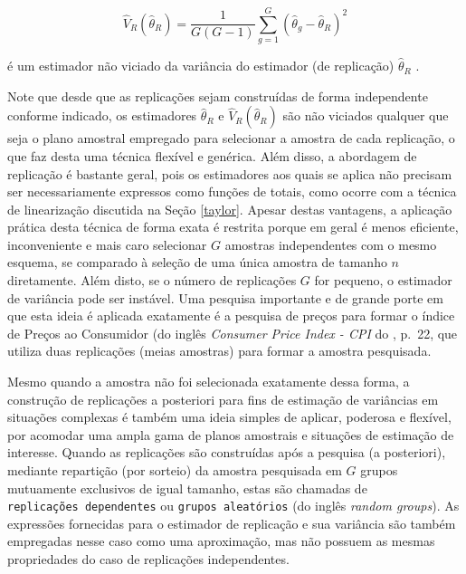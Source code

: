 \documentclass[]{book}
\numberwithin{example}{chapter}
\numberwithin{remark}{chapter}
\numberwithin{definition}{chapter}
\begin{document}
\begin{equation}
\widehat{V}_{R}\left( \widehat{\theta }_{R}\right) =\frac{1}{G\left(
G-1\right) }\sum_{g=1}^{G}\left( \widehat{\theta }_{g}-\widehat{\theta }%
_{R}\right) ^{2}  \label{eq:estpa24}
\end{equation}

é um estimador não viciado da variância do estimador (de replicação)
\(\widehat{\theta }_{R}\) .

Note que desde que as replicações sejam construídas de forma
independente conforme indicado, os estimadores \(\widehat{\theta }_{R}\)
e \(\widehat{V}_{R}\left( \widehat{\theta }_{R}\right)\) são não
viciados qualquer que seja o plano amostral empregado para selecionar a
amostra de cada replicação, o que faz desta uma técnica flexível e
genérica. Além disso, a abordagem de replicação é bastante geral, pois
os estimadores aos quais se aplica não precisam ser necessariamente
expressos como funções de totais, como ocorre com a técnica de
linearização discutida na Seção \ref{taylor}. Apesar destas vantagens, a
aplicação prática desta técnica de forma exata é restrita porque em
geral é menos eficiente, inconveniente e mais caro selecionar \(G\)
amostras independentes com o mesmo esquema, se comparado à seleção de
uma única amostra de tamanho \(n\) diretamente. Além disto, se o número
de replicações \(G\) for pequeno, o estimador de variância pode ser
instável. Uma pesquisa importante e de grande porte em que esta ideia é
aplicada exatamente é a pesquisa de preços para formar o índice de
Preços ao Consumidor (do inglês \emph{Consumer Price Index - CPI} do
\citep{USBureau}, p.~22, que utiliza duas replicações (meias amostras)
para formar a amostra pesquisada.

Mesmo quando a amostra não foi selecionada exatamente dessa forma, a
construção de replicações a posteriori para fins de estimação de
variâncias em situações complexas é também uma ideia simples de aplicar,
poderosa e flexível, por acomodar uma ampla gama de planos amostrais e
situações de estimação de interesse. Quando as replicações são
construídas após a pesquisa (a posteriori), mediante repartição (por
sorteio) da amostra pesquisada em \(G\) grupos mutuamente exclusivos de
igual tamanho, estas são chamadas de \texttt{replicações\ dependentes}
ou \texttt{grupos\ aleatórios} (do inglês \emph{random groups}). As
expressões fornecidas para o estimador de replicação e sua variância são
também empregadas nesse caso como uma aproximação, mas não possuem as
mesmas propriedades do caso de replicações independentes.
\end{document}
